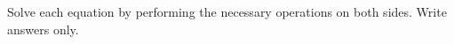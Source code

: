\question Solve each equation by performing the necessary operations on both sides. Write answers only.

\begin{multicols}{3}
\end{multicols}
